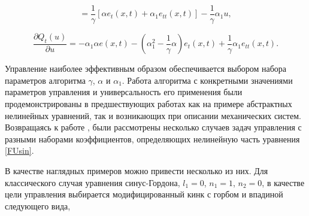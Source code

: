 $$
	 = \frac{1}{\gamma} \left[\alpha e_t(x,t) + \alpha_1 e_{tt}(x,t)\right] - \frac{1}{\gamma} \alpha_1 u,
$$


\begin{equation}
	\frac{\partial Q_t(u)}{\partial u} =  - \alpha_1 \alpha e(x,t) - \left(\alpha_1^2 - \frac{1}{\gamma}\alpha\right) e_t(x,t) + \frac{1}{\gamma}\alpha_1 e_{tt}(x,t).
\end{equation}



Управление наиболее эффективным образом обеспечивается выбором набора параметров алгоритма $\gamma$, $\alpha$ и $\alpha_1$. Работа алгоритма с конкретными значениями параметров управления и универсальность его применения были продемонстрированы в предшествующих работах как на примере абстрактных нелинейных уравнений, так и возникающих при описании механических систем. Возвращаясь к работе \cite{porant16}, были рассмотрены несколько случаев задач управления с разными наборами коэффициентов, определяющих нелинейную часть уравнения \eqref{FUsin}.

В качестве наглядных примеров можно привести несколько из них. Для классического случая уравнения синус-Гордона, $l_1 = 0$, $n_1 = 1$, $n_2 = 0$, в качестве цели управления выбирается модифицированный кинк с горбом и впадиной следующего вида,

